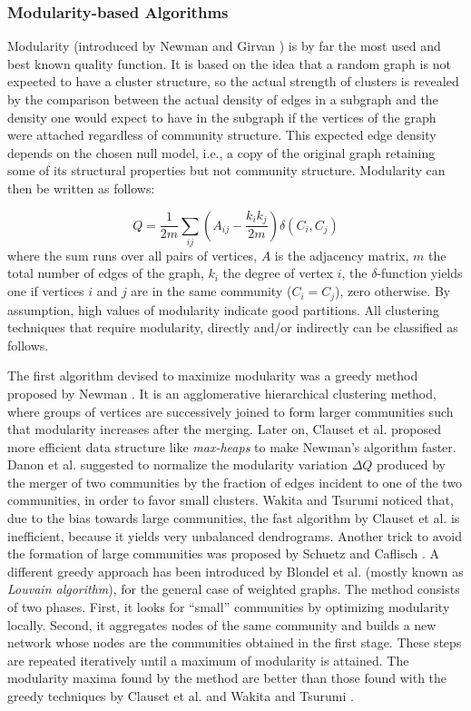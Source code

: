 \subsubsection*{Modularity-based Algorithms}
Modularity (introduced by Newman and Girvan \cite{ng2002}) is by far the most used and best known quality function. It is based on the
idea that a random graph is not expected to have a cluster structure, so the actual strength of clusters is revealed by the comparison
between the actual density of edges in a subgraph and the density one would expect to have in the subgraph if the vertices of the graph were
attached regardless of community structure. This expected edge density depends on the chosen null model, i.e., a copy of the original graph
retaining some of its structural properties but not community structure. Modularity can then be written as follows:

\begin{equation}\label{modularity}
 Q=\frac{1}{2m}\sum_{ij}(A_{ij} - \frac{k_i k_j}{2m})\delta(C_i,C_j)
\end{equation}
where the sum runs over all pairs of vertices, $A$ is the adjacency matrix, $m$ the total number of edges of the graph, $k_i$ the degree of
vertex $i$, the $\delta$-function yields one if vertices $i$ and $j$ are in the same community ($C_i = C_j$), zero otherwise. By assumption,
high values of modularity indicate good partitions. All clustering techniques that require modularity, directly and/or indirectly can be
classified as follows.

 The first algorithm devised to maximize modularity was a greedy method proposed by Newman
\cite{PhysRevE.69.066133}. It is an agglomerative hierarchical clustering method, where groups of vertices are successively joined to form
larger communities such that modularity increases after the merging. Later on, Clauset et al. \cite{cnm2004} proposed more efficient data
structure like {\em max-heaps} to
make Newman's algorithm faster.  Danon et al. \cite{Danon2006} suggested to normalize the modularity variation
$\Delta Q$ produced by the merger of two communities by the fraction of edges incident to one of the two communities, in order to favor
small clusters. Wakita and Tsurumi \cite{Wakita:2007} noticed that, due to the bias towards large communities, the fast
algorithm by Clauset et al. is inefficient, because it yields very unbalanced dendrograms. Another trick to avoid the formation of large
communities was proposed by Schuetz and Caflisch \cite{SC08}. A different greedy approach has been introduced by Blondel et al.
\cite{bgll2008} (mostly known as {\em Louvain
algorithm}), for the general case of weighted graphs. The method consists of two phases. First, it looks for ``small'' communities by
optimizing modularity locally. Second, it aggregates nodes of the same community and builds a new network whose nodes are the
communities obtained in the first stage. These steps are repeated iteratively until a maximum of modularity is attained. The modularity
maxima found by the method are
better than those found with the greedy techniques by Clauset et al. \cite{cnm2004} and Wakita and Tsurumi \cite{Wakita:2007}.


